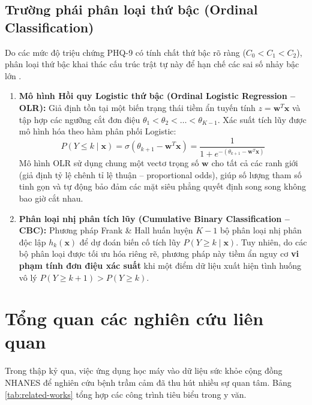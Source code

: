 \subsection{Trường phái phân loại thứ bậc (Ordinal Classification)}
\label{subsec:ordinal-paradigm}

Do các mức độ triệu chứng PHQ-9 có tính chất thứ bậc rõ ràng ($C_0 < C_1 < C_2$), phân loại thứ bậc khai thác cấu trúc trật tự này để hạn chế các sai số nhảy bậc lớn \cite{mccullagh1980regression, frank2001simple}.

\begin{enumerate}
    \item \textbf{Mô hình Hồi quy Logistic thứ bậc (Ordinal Logistic Regression -- OLR):} Giả định tồn tại một biến trạng thái tiềm ẩn tuyến tính $z = \mathbf{w}^T \mathbf{x}$ và tập hợp các ngưỡng cắt đơn điệu $\theta_1 < \theta_2 < \dots < \theta_{K-1}$. Xác suất tích lũy được mô hình hóa theo hàm phân phối Logistic:
    \begin{equation}
        P(Y \le k \mid \mathbf{x}) = \sigma(\theta_{k+1} - \mathbf{w}^T \mathbf{x}) = \frac{1}{1 + e^{-(\theta_{k+1} - \mathbf{w}^T \mathbf{x})}}
    \end{equation}
    Mô hình OLR sử dụng chung một vectơ trọng số $\mathbf{w}$ cho tất cả các ranh giới (giả định tỷ lệ chênh tỉ lệ thuận -- proportional odds), giúp số lượng tham số tinh gọn và tự động bảo đảm các mặt siêu phẳng quyết định song song không bao giờ cắt nhau.
    \item \textbf{Phân loại nhị phân tích lũy (Cumulative Binary Classification -- CBC):} Phương pháp Frank \& Hall huấn luyện $K-1$ bộ phân loại nhị phân độc lập $h_k(\mathbf{x})$ để dự đoán biến cố tích lũy $P(Y \ge k \mid \mathbf{x})$. Tuy nhiên, do các bộ phân loại được tối ưu hóa riêng rẽ, phương pháp này tiềm ẩn nguy cơ \textbf{vi phạm tính đơn điệu xác suất} khi một điểm dữ liệu xuất hiện tình huống vô lý $P(Y \ge k+1) > P(Y \ge k)$.
\end{enumerate}

\section{Tổng quan các nghiên cứu liên quan}
\label{sec:nghien-cuu-lien-quan}

Trong thập kỷ qua, việc ứng dụng học máy vào dữ liệu sức khỏe cộng đồng NHANES để nghiên cứu bệnh trầm cảm đã thu hút nhiều sự quan tâm. Bảng \ref{tab:related-works} tổng hợp các công trình tiêu biểu trong y văn.

